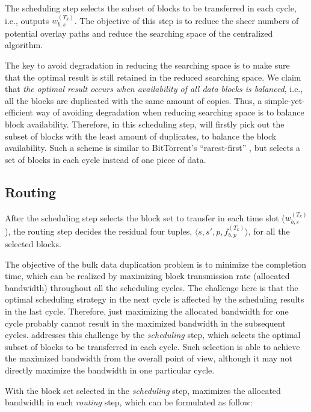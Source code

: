 The scheduling step
selects the subset of blocks to be transferred in each cycle, i.e.,
outputs $w^{(T_k)}_{b,s}$. The objective of this step is to reduce the sheer numbers of potential overlay paths and reduce the searching space of the centralized algorithm.


The key to avoid degradation in reducing the searching space is to make sure that the optimal result is still retained in the reduced searching space. We claim that {\em the optimal result occurs when availability of all data blocks is balanced}, i.e., all the blocks are duplicated with the same amount of copies. Thus, a simple-yet-efficient way of avoiding degradation when reducing searching space is to balance block availability. Therefore, in this scheduling step, \name will firstly pick out the subset of blocks with the least amount of duplicates, to balance the block availability. Such a scheme is similar to BitTorrent's ``rarest-first'' \cite{Cohen2003Incentives}, but \name selects a set of blocks in each cycle instead of one piece of data.


\subsection{Routing}
\label{subsec:logic:routing}

After the scheduling step selects the block set to transfer in each time slot ($w^{(T_k)}_{b,s}$), the routing step decides the residual four tuples, $\langle s, s', p, f_{b,p}^{(T_k)} \rangle$, for all the selected blocks.

The objective of the bulk data duplication problem is to minimize the completion time, which can be realized by maximizing block transmission rate (allocated bandwidth) throughout all the scheduling cycles. The challenge here is that the optimal scheduling strategy in the next cycle is affected by the scheduling results in the last cycle. Therefore, just maximizing the allocated bandwidth for one cycle probably cannot result in the maximized bandwidth in the subsequent cycles. \name addresses this challenge by the {\em scheduling} step, which selects the optimal subset of blocks to be transferred in each cycle. Such selection is able to achieve the maximized bandwidth from the overall point of view, although it may not directly maximize the bandwidth in one particular cycle.

With the block set selected in the {\em scheduling} step, \name maximizes the allocated bandwidth in each {\em routing} step, which can be formulated as follow:

